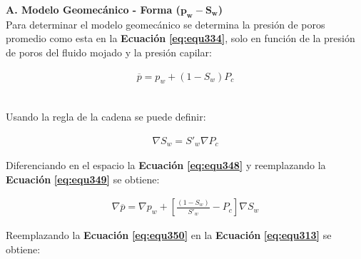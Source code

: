 \bigskip
\textbf{A. Modelo Geomecánico - Forma ($\mathbf{p_w-S_w}$)}
\\
Para determinar el modelo geomecánico se determina la presión de poros promedio como esta en la \textbf{Ecuación} \textbf{\ref{eq:equ334}}, solo en función de la presión de poros del fluido mojado y la presión capilar:

\begin{ceqn} 
\begin{gather} \label{eq:equ348} 
\overline{p} = p_w + (1-S_w)P_c
\end{gather}  
\end{ceqn}
\\
Usando la regla de la cadena se puede definir:

\begin{ceqn} 
\label{eq:equ349} 
\begin{gather}
\nabla S_w = S'_w \nabla P_c
\end{gather}  
\end{ceqn}
\bigskip
Diferenciando en el espacio la \textbf{Ecuación} \textbf{\ref{eq:equ348}} y reemplazando la \textbf{Ecuación} \textbf{\ref{eq:equ349}} se obtiene:

\begin{ceqn} 
\begin{gather} \label{eq:equ350} 
\nabla \overline{p} = \nabla p_w + \left[\frac{(1-S_w)}{S'_w}-P_c\right]\nabla S_w
\end{gather}  
\end{ceqn}
\bigskip
Reemplazando la \textbf{Ecuación} \textbf{\ref{eq:equ350}} en la \textbf{Ecuación} \textbf{\ref{eq:equ313}} se obtiene:

